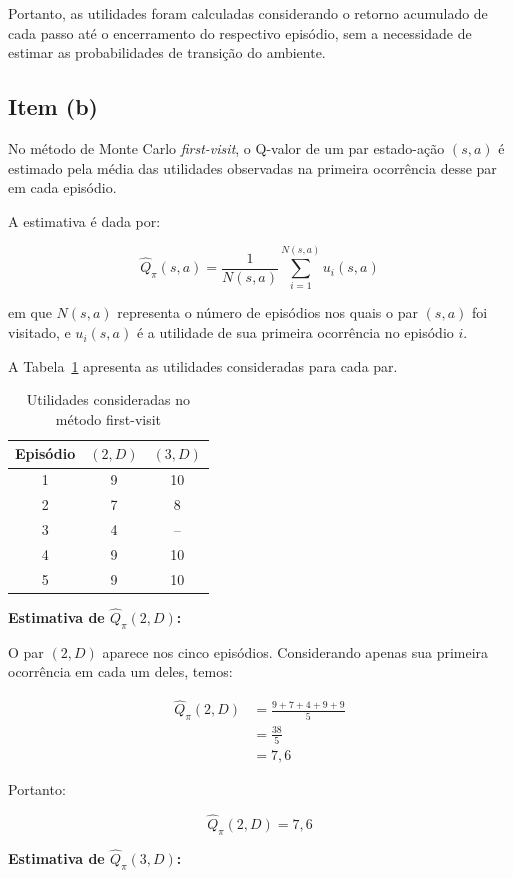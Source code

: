 Portanto, as utilidades foram calculadas
considerando o retorno acumulado de cada
passo até o encerramento do respectivo episódio,
sem a necessidade de estimar as probabilidades
de transição do ambiente.


\subsection{Item (b)}

No método de Monte Carlo \textit{first-visit},
o Q-valor de um par estado-ação $(s,a)$
é estimado pela média das utilidades
observadas na primeira ocorrência desse
par em cada episódio.

A estimativa é dada por:

\[
\hat{Q}_{\pi}(s,a)=
\frac{1}{N(s,a)}
\sum_{i=1}^{N(s,a)}u_i(s,a)
\]

em que $N(s,a)$ representa o número de
episódios nos quais o par $(s,a)$ foi
visitado, e $u_i(s,a)$ é a utilidade
de sua primeira ocorrência no episódio $i$.

A Tabela~\ref{tab:first_visit} apresenta
as utilidades consideradas para cada par.

\begin{table}[H]
\centering
\caption{Utilidades consideradas no método first-visit}
\label{tab:first_visit}
\begin{tabular}{ccc}
\toprule
Episódio & $(2,D)$ & $(3,D)$\\
\midrule
1 & 9 & 10\\
2 & 7 & 8\\
3 & 4 & --\\
4 & 9 & 10\\
5 & 9 & 10\\
\bottomrule
\end{tabular}
\end{table}

\textbf{Estimativa de $\hat{Q}_{\pi}(2,D)$:}

O par $(2,D)$ aparece nos cinco episódios.
Considerando apenas sua primeira ocorrência
em cada um deles, temos:

\[
\begin{aligned}
\hat{Q}_{\pi}(2,D)
&=\frac{9+7+4+9+9}{5}\\
&=\frac{38}{5}\\
&=7{,}6
\end{aligned}
\]

Portanto:

\[
\boxed{\hat{Q}_{\pi}(2,D)=7{,}6}
\]

\textbf{Estimativa de $\hat{Q}_{\pi}(3,D)$:}

